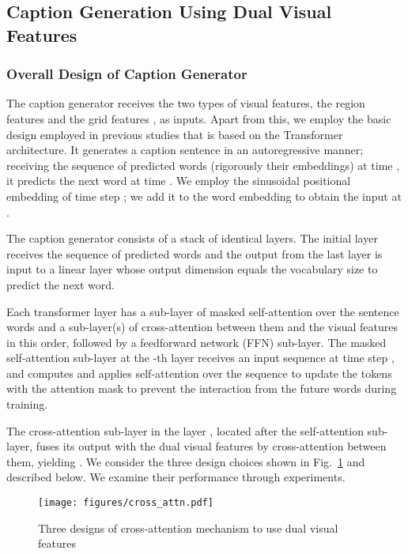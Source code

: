 \documentclass[runningheads]{llncs}
\begin{document}
\subsection{Caption Generation Using Dual Visual Features} 
\label{sec:generation}

\subsubsection{Overall Design of Caption Generator}

The caption generator receives the two types of visual features, the region features  and the grid features , as inputs. Apart from this, we employ the basic design employed in previous studies \cite{vaswani2017attention,herdade2019image} that is based on the Transformer architecture. It generates a caption sentence in an autoregressive manner; receiving the sequence of predicted words (rigorously their embeddings) at time , it predicts the next word at time . We employ the sinusoidal positional embedding of time step  \cite{vaswani2017attention}; we add it to the word embedding to obtain the input  at . 

The caption generator consists of a stack of  identical layers. The initial layer receives the sequence of predicted words and the output from the last layer is input to a linear layer whose output dimension equals the vocabulary size to predict the next word.

Each transformer layer has a sub-layer of masked self-attention over the sentence words and a sub-layer(s) of cross-attention between them and the visual features in this order, followed by a feedforward network (FFN) sub-layer.
The masked self-attention sub-layer at the -th layer receives an input sequence  
at time step , and computes and applies self-attention over the sequence to update the tokens with the attention mask to prevent the interaction from the future words during training.

The cross-attention sub-layer in the layer , located after the self-attention sub-layer, fuses its output with the dual visual features by cross-attention between them, yielding .
We consider the three design choices shown in Fig.~\ref{fig:cross_attn} and described below. We examine their performance through experiments. 

\begin{figure}[t]
\begin{center}
\texttt{[image: figures/cross\_attn.pdf]}
\end{center}
   \caption{Three designs of cross-attention mechanism to use dual visual features}
\label{fig:cross_attn}
\end{figure}
\end{document}
